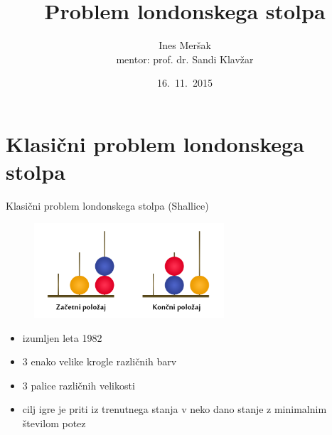 \documentclass{beamer}
\title{Problem londonskega stolpa}
\author[Ines Meršak]{Ines Meršak \\[5px] mentor: prof. dr. Sandi Klavžar}
\date{16.~11.~2015}
\begin{document}
    
\begin{frame}[plain]
    \titlepage
\end{frame}


\section{Klasični problem londonskega stolpa}
\begin{frame}{Klasični problem londonskega stolpa (Shallice)}
    \begin{figure}
        \centering
        \includegraphics[height=100pt]{img/london-tower.png}
    \end{figure}
    \begin{itemize}
        \item izumljen leta 1982
        \item 3 enako velike krogle različnih barv
        \item 3 palice različnih velikosti
        \item cilj igre je priti iz trenutnega stanja v neko dano stanje z minimalnim številom potez
    \end{itemize}
\end{frame}
\end{document}
